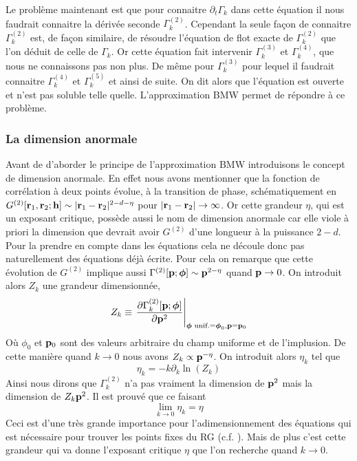 \documentclass[10pt]{article}
\begin{document}
\begin{multicols}{2}
Le problème maintenant est que pour connaitre $\partial_t \Gamma_k$ dans cette équation il nous faudrait connaitre la dérivée seconde $\Gamma_k^{(2)}$. Cependant la seule façon de connaitre $\Gamma_k^{(2)}$ est, de façon similaire, de résoudre l'équation de flot exacte de $\Gamma_k^{(2)}$ que l'on déduit de celle de $\Gamma_k$. Or cette équation fait intervenir $\Gamma_k^{(3)}$ et $\Gamma_k^{(4)}$, que nous ne connaissons pas non plus. De même pour $\Gamma_k^{(3)}$ pour lequel il faudrait connaitre $\Gamma_k^{(4)}$ et  $\Gamma_k^{(5)}$ et ainsi de suite. On dit alors que l'équation est ouverte et n'est pas soluble telle quelle. L'approximation BMW permet de répondre à ce problème. 


\vspace*{11pt}
\subsubsection{La dimension anormale}

\label{sec:DimAnorm}

Avant de d'aborder le principe de l'approximation BMW introduisons le concept de dimension anormale. En effet nous avons mentionner que la fonction de corrélation à deux points évolue, à la transition de phase, schématiquement en $G^{(2)}[{\bf r}_1, {\bf r}_2; {\bf h}] \sim |{\bf r}_1 - {\bf r}_2|^{2-d-\eta}$ pour $|{\bf r}_1 - {\bf r}_2| \to \infty$. Or cette grandeur $\eta$, qui est un exposant critique, possède aussi le nom de dimension anormale car elle viole à priori la dimension que devrait avoir $G^{(2)}$ d'une longueur à la puissance $2-d$. Pour la prendre en compte dans les équations cela ne découle donc pas naturellement des équations déjà écrite. Pour cela on remarque que cette évolution de $G^{(2)}$ implique aussi $\Gamma^{(2)}[{\bf p}; \boldsymbol{ \phi}] \sim {\bf p}^{2-\eta}$ quand ${\bf p} \to 0$. On introduit alors $Z_k$ une grandeur dimensionnée,
\begin{equation}
	Z_k \equiv {\left. \frac{\partial \Gamma_k^{(2)}[{\bf p};\boldsymbol{ \phi}]}{\partial {\bf p}^2} \right|}_{\boldsymbol{ \phi} \text{ unif.} = \boldsymbol{ \phi}_0, {\bf p} = {\bf p}_0 }
	\label{eq:defZk}
\end{equation}
Où $\phi_0$ et ${\bf p}_0$ sont des valeurs arbitraire du champ uniforme et de l'implusion. De cette manière  quand $k \to 0$ nous avons $Z_k \propto {\bf p}^{-\eta}$.
On introduit alors $\eta_k$ tel que
\begin{equation}
	\eta_k = -k \partial_k \ln(Z_k)
\end{equation}
Ainsi nous dirons que $\Gamma^{(2)}_k$ n'a pas vraiment la dimension de ${\bf p}^2$ mais la dimension de $Z_k{\bf p}^2$. Il est prouvé \cite{} que ce faisant 
\begin{equation}
 	\lim\limits_{k \to 0} \eta_k  = \eta
 \end{equation}
Ceci est d'une très grande importance pour l'adimensionnement des équations qui est nécessaire pour trouver les points fixes du RG (c.f. ). Mais de plus c'est cette grandeur qui va donne l'exposant critique $\eta$ que l'on recherche quand $k \to 0$.



\end{multicols}
\end{document}
